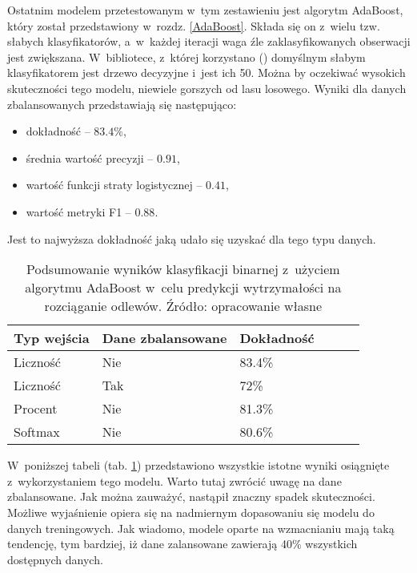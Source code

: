 Ostatnim modelem przetestowanym w~tym zestawieniu jest algorytm AdaBoost, który został przedstawiony w~rozdz. \ref{AdaBoost}. Składa się on z~wielu tzw. słabych klasyfikatorów, a~w~każdej iteracji waga źle zaklasyfikowanych obserwacji jest zwiększana. W~bibliotece, z~której korzystano () domyślnym słabym klasyfikatorem jest drzewo decyzyjne i~jest ich 50. Można by oczekiwać wysokich skuteczności tego modelu, niewiele gorszych od lasu losowego. 
Wyniki dla danych zbalansowanych przedstawiają się następująco:
\begin{itemize}
	\item dokładność – $83.4\%$,
	\item średnia wartość precyzji – $0.91$,
	\item wartość funkcji straty logistycznej – $0.41$,
	\item wartość metryki F1 – $0.88$.
\end{itemize}
Jest to najwyższa dokładność jaką udało się uzyskać dla tego typu danych.
\begin{table}[!h]
	\centering
	\begin{threeparttable}
		\caption{Podsumowanie wyników klasyfikacji binarnej z~użyciem algorytmu AdaBoost w~celu predykcji wytrzymałości na rozciąganie odlewów. Źródło: opracowanie własne}
		\label{ada.summary.table}
		\begin{tabularx}{1\textwidth}{ |X|X|X|X|X|X| }
		  \hline
		  \textbf{Typ wejścia} & \textbf{Dane zbalansowane} & \textbf{Dokładność}  \\
		  \hline

	          Liczność & Nie & 83.4\%\\
		  \hline

	          Liczność & Tak & 72\%\\
		  \hline

	          Procent & Nie & 81.3\%\\
		  \hline

	          Softmax & Nie & 80.6\%\\
		  \hline
		\end{tabularx}
	\end{threeparttable}
\end{table}
W~poniższej tabeli (tab. \ref{ada.summary.table}) przedstawiono wszystkie istotne wyniki osiągnięte z~wykorzystaniem tego modelu.
Warto tutaj zwrócić uwagę na dane zbalansowane. Jak można zauważyć, nastąpił znaczny spadek skuteczności. Możliwe wyjaśnienie opiera się na nadmiernym dopasowaniu się modelu do danych treningowych. Jak wiadomo, modele oparte na wzmacnianiu mają taką tendencję, tym bardziej, iż dane zalansowane zawierają 40\% wszystkich dostępnych danych.

